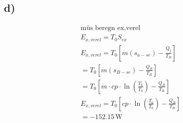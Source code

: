 

\subsection*{d)}

\begin{align*}
    &\text{müs beregn ex,verel} \\
    &E_{x,verel} = T_0 S_{ex} \\
    &E_{x,verel} = T_0 \left[ \dot{m} (s_{a-se}) - \frac{\dot{Q}_j}{T_B} \right] \\
    &= T_0 \left[ \dot{m} (s_{B-se}) - \frac{Q_B}{T_B} \right] \\
    &= T_0 \left[ \dot{m} \cdot cp \cdot \ln \left( \frac{T_6}{T_0} \right) - \frac{Q_B}{T_B} \right] \\
    &E_{x,verel} = T_0 \left[ cp \cdot \ln \left( \frac{T_6}{T_0} \right) - \frac{Q_B}{T_B} \right] \\
    &= -152.15 \, \text{W}
\end{align*}